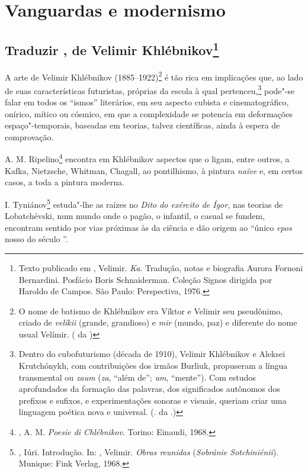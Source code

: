 \part{Vanguardas e modernismo}

\chapter{Traduzir \emph{\protect{}}, de Velimir
Khlébnikov\footnote{Texto publicado em \protect{},
Velimir. \emph{Ka}. Tradução, notas e biografia Aurora Fornoni
Bernardini. Posfácio Boris Schnaiderman. Coleção Signos dirigida
por Haroldo de Campos. São Paulo: Perspectiva, 1976.}}
\label{KA}

A arte de Velimir Khlébnikov (1885--1922)\footnote{O nome de
batismo de Khlébnikov era Víktor e Velimir seu pseudônimo, criado
de \emph{velíkii} (grande, grandioso) e \emph{mir} (mundo, paz) e
diferente do nome usual Velímir. ( da )} é
tão rica em implicações que, ao lado de suas características
futuristas, próprias da escola à qual pertenceu,\footnote{Dentro
do cubofuturismo (década de 1910), Velimir Khlébnikov e Aleksei Krutchónykh, com contribuições dos irmãos Burliuk, propuseram
a língua transmental ou \emph{zaum} (\emph{za}, ``além de'';
\emph{um}, ``mente''). Com estudos aprofundados da formação
das palavras, dos significados autônomos dos prefixos e sufixos,
e experimentações sonoras e visuais, queriam criar uma linguagem
poética nova e universal. (. da .)} pode"-se falar
em todos os ``ismos'' literários, em seu aspecto cubista e
cinematográfico, onírico, mítico ou cósmico, em que a complexidade
se potencia em deformações espaço"-temporais, baseadas em teorias,
talvez científicas, ainda à espera de comprovação.

A. M. Ripelino\footnote{, A. M. \emph{Poesie
di Chlébnikov}. Torino: Einaudi, 1968.} encontra em Khlébnikov
aspectos que o ligam, entre outros, a Kafka, Nietzsche, Whitman,
Chagall, ao pontilhismo, à pintura \emph{naïve} e, em certos
casos, a toda a pintura moderna.

I. Tyniánov\footnote{, Iúri. Introdução. In:
, Velimir. \emph{Obras reunidas}
(\emph{Sobránie Sotchiniénii}). Munique: Fink Verlag, 1968.}
estuda"-lhe as raízes no \emph{Dito do exército de Ígor,} nas
teorias de Lobatchévski, num mundo onde o pagão, o infantil,
o casual se fundem, encontram sentido por vias próximas às
da ciência e dão origem ao ``único \emph{epos} nosso do século ''.

